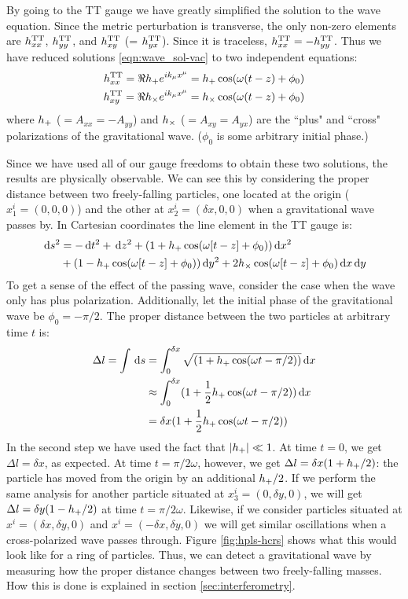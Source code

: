 By going to the TT gauge we have greatly simplified the solution to the wave equation. Since the metric perturbation is transverse, the only non-zero elements are $h^{\mathrm{TT}}_{xx}$, $h^{\mathrm{TT}}_{yy}$, and $h^{\mathrm{TT}}_{xy}$ (= $h^{\mathrm{TT}}_{yx}$). Since it is traceless, $h^{\mathrm{TT}}_{xx} = -h^{\mathrm{TT}}_{yy}$. Thus we have reduced solutions \ref{eqn:wave_sol-vac} to two independent equations:
\begin{align}
h^{\mathrm{TT}}_{xx} = \Re h_{+} e^{ik_\mu x^\mu} = h_{+} \cos(\omega(t-z) + \phi_0) \\
h^{\mathrm{TT}}_{xy} = \Re h_{\times} e^{ik_\mu x^\mu} = h_{\times} \cos(\omega(t-z) + \phi_0)
\end{align}
where $h_{+}$ ($= A_{xx} = -A_{yy}$) and $h_{\times}$ ($= A_{xy} = A_{yx}$) are the ``plus" and ``cross" polarizations of the gravitational wave. ($\phi_0$ is some arbitrary initial phase.)

Since we have used all of our gauge freedoms to obtain these two solutions, the results are physically observable. We can see this by considering the proper distance between two freely-falling particles, one located at the origin ($x_1^i = (0,0,0)$) and the other at $x_2^i = (\delta x,0,0)$ when a gravitational wave passes by. In Cartesian coordinates the line element in the TT gauge is:
\begin{align}
\label{eqn:gen_line_element}
\d s^2 &= -\d t^2 + \d z^2 + (1+ h_\pls \cos(\omega[t-z]+\phi_0)) \d x^2 \\
     &+ (1 - h_\pls \cos(\omega[t-z]+\phi_0)) \d y^2 + 2 h_\crs \cos(\omega[t-z]+\phi_0) \d x \d y
\end{align}
To get a sense of the effect of the passing wave, consider the case when the wave only has plus polarization. Additionally, let the initial phase of the gravitational wave be $\phi_0 = -\pi/2$. The proper distance between the two particles at arbitrary time $t$ is: 
\begin{align}
\Delta l = \int \,\mathrm{d} s &= \int_0^{\delta x} \sqrt{(1 + h_{+} \cos(\omega t - \pi/2))} \,\mathrm{d} x \\
    &\approx \int_0^{\delta x} (1 + \frac{1}{2} h_{+} \cos(\omega t - \pi/2)) \,\mathrm{d} x \\
    &= \delta x (1 + \frac{1}{2} h_{+} \cos(\omega t - \pi/2))
\end{align}
In the second step we have used the fact that $|h_{+}| \ll 1$. At time $t=0$, we get $\Delta l = \delta x$, as expected. At time $t= \pi/2\omega$, however, we get $\Delta l = \delta x(1 + h_{+}/2)$: the particle has moved from the origin by an additional $h_{+}/2$. If we perform the same analysis for another particle situated at $x_3^i = (0,\delta y, 0)$, we will get $\Delta l = \delta y(1 - h_{+}/2)$ at time $t = \pi/2\omega$. Likewise, if we consider particles situated at $x^i = (\delta x, \delta y, 0)$ and $x^i = (-\delta x, \delta y, 0)$ we will get similar oscillations when a cross-polarized wave passes through. Figure \ref{fig:hpls-hcrs} shows what this would look like for a ring of particles. Thus, we can detect a gravitational wave by measuring how the proper distance changes between two freely-falling masses. How this is done is explained in section \ref{sec:interferometry}.

